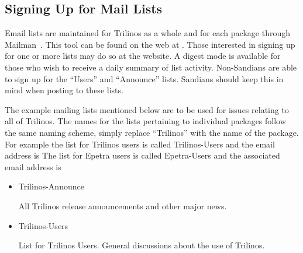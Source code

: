 \documentclass[12pt,relax]{TrilinosUserGuide}
\begin{document}
\subsection{Signing Up for Mail Lists}
\label{subsect:MailMan}
Email lists are maintained for Trilinos as a whole and for each package 
through Mailman~\cite{Mailman}.  This tool can be found on the web at 
\newline
{}.  
Those interested in signing 
up for one or more lists may do so at the website.  A digest mode is 
available for those who wish to receive a daily summary of list activity.  
Non-Sandians are able to sign up for the ``Users'' and ``Announce'' 
lists.  Sandians should keep this in mind when posting to these lists.

\begin{minipage}[c]{\textwidth}
\begin{minipage}[l]{.6\textwidth}
The example mailing lists mentioned below are to be used 
for issues relating to all of Trilinos.  The names for the lists pertaining to 
individual packages follow the same naming scheme, simply replace ``Trilinos'' 
with the name of the package.  For example the list for Trilinos users is 
called Trilinos-Users and the email address is 
  The list 
for Epetra users is called Epetra-Users and the associated email address is 
\end{minipage}\hfill
{}
\end{minipage}


\begin{itemize}
\item Trilinos-Announce 

All Trilinos release announcements and other major news.

\item Trilinos-Users 

List for Trilinos Users.  General discussions about the use of Trilinos.
\end{itemize}
\end{document}
